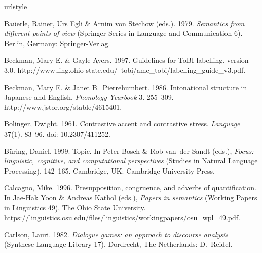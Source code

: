 \documentclass{goken}
\newcommand{\ori}[1]{\noindent\textcolor[gray]{0.7}{\fontsize{8pt}{8pt}\selectfont{\textsf{(p.~#1)}}} }
\begin{document}
\ori{64}

%

\begin{thebibliography}{74}
\providecommand{\natexlab}[1]{#1}
\providecommand{\url}[1]{#1}
\providecommand{\urlprefix}{}
\expandafter\ifx\csname urlstyle\endcsname\relax
  \providecommand{\doi}[1]{doi: \discretionary{}{}{}#1}\else
  \providecommand{\doi}{doi: \discretionary{}{}{}\begingroup
  \urlstyle{rm}\Url}\fi

Ba\"{u}erle, Rainer, Urs Egli \& Arnim von Stechow (eds.). 1979.
\newblock \emph{Semantics from different points of view} (Springer
Series in Language and Communication 6).
\newblock Berlin, Germany: Springer-Verlag.

Beckman, Mary E. \& Gayle Ayers. 1997.
\newblock Guidelines for {ToBI} labelling. version 3.0.
\newblock
  \urlprefix\url{http://www.ling.ohio-state.edu/~tobi/ame_tobi/labelling_guide_v3.pdf}.

Beckman, Mary E. \& Janet B.~Pierrehumbert. 1986.
\newblock Intonational structure in {J}apanese and {E}nglish.
\newblock \emph{Phonology Yearbook} 3. 255--309.
\newblock \urlprefix\url{http://www.jstor.org/stable/4615401}.

Bolinger, Dwight. 1961.
\newblock Contrastive accent and contrastive stress.
\newblock \emph{Language} 37(1). 83--96.
\newblock \doi{10.2307/411252}.

B{\"u}ring, Daniel. 1999.
\newblock Topic.
\newblock In Peter Bosch \& Rob van~der Sandt (eds.), \emph{Focus: linguistic,
  cognitive, and computational perspectives} (Studies in Natural Language
  Processing), 142--165. Cambridge, UK: Cambridge University Press.

Calcagno, Mike. 1996.
\newblock Presupposition, congruence, and adverbs of quantification.
\newblock In Jae-Hak Yoon \& Andreas Kathol (eds.), \emph{Papers in semantics}
  (Working Papers in Linguistics 49), The Ohio State University.
\newblock
  \urlprefix\url{https://linguistics.osu.edu/files/linguistics/workingpapers/osu_wpl_49.pdf}.

Carlson, Lauri. 1982.
\newblock \emph{Dialogue games: an approach to discourse analysis} (Synthese
  Language Library 17).
\newblock Dordrecht, The Netherlands: D.~Reidel.


\end{thebibliography}
\end{document}
